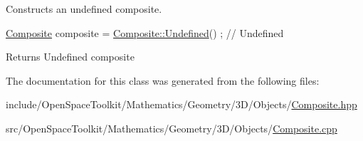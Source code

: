 Constructs an undefined composite. 


\begin{DoxyCode}
\hyperlink{classostk_1_1math_1_1geom_1_1d3_1_1objects_1_1_composite_aaecda2f184484d63a52de87706a37d4c}{Composite} composite = \hyperlink{classostk_1_1math_1_1geom_1_1d3_1_1objects_1_1_composite_abd7585518f349e7d599a81102f9e0e41}{Composite::Undefined}() ; \textcolor{comment}{// Undefined}
\end{DoxyCode}


\begin{DoxyReturn}{Returns}
Undefined composite 
\end{DoxyReturn}


The documentation for this class was generated from the following files\+:\begin{DoxyCompactItemize}
\item 
include/\+Open\+Space\+Toolkit/\+Mathematics/\+Geometry/3\+D/\+Objects/\hyperlink{_composite_8hpp}{Composite.\+hpp}\item 
src/\+Open\+Space\+Toolkit/\+Mathematics/\+Geometry/3\+D/\+Objects/\hyperlink{_composite_8cpp}{Composite.\+cpp}\end{DoxyCompactItemize}
